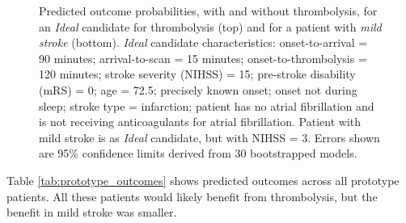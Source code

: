 \begin{figure}[h]
\begin{subfigure}[b]{1.0\textwidth}
        \label{fig:patient_outcome_subfig2}
    \end{subfigure}
    \caption{Predicted outcome probabilities, with and without thrombolysis, for an \textit{Ideal} candidate for thrombolysis (top) and for a patient with \textit{mild stroke} (bottom). \textit{Ideal} candidate characteristics: onset-to-arrival = 90 minutes; arrival-to-scan = 15 minutes; onset-to-thrombolysis = 120 minutes; stroke severity (NIHSS) = 15; pre-stroke disability (mRS) = 0; age = 72.5; precisely known onset; onset not during sleep; stroke type = infarction; patient has no atrial fibrillation and is not receiving anticoagulants for atrial fibrillation. Patient with mild stroke is as \textit{Ideal} candidate, but with NIHSS = 3. Errors shown are 95\% confidence limits derived from 30 bootstrapped models.}
    \label{fig:example_patient_outcomes}
\end{figure}



Table \ref{tab:prototype_outcomes} shows predicted outcomes across all prototype patients. All these patients would likely benefit from thrombolysis, but the benefit in mild stroke was smaller.

